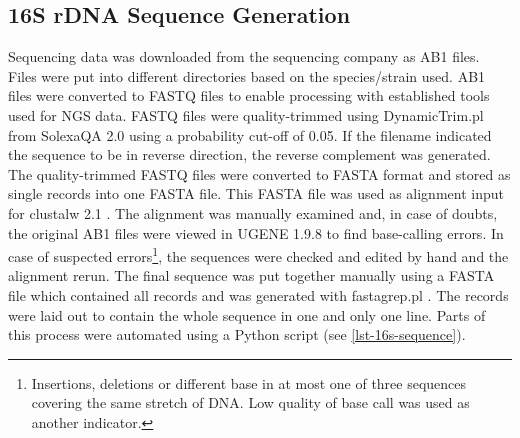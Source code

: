 \subsection{16S rDNA Sequence Generation\label{subsec-met-16s-computation}}
Sequencing data was downloaded from the sequencing company as AB1 files. Files were put into different directories based on the species/strain used. AB1 files were converted to FASTQ files to enable processing with established tools used for NGS data. FASTQ files were quality-trimmed using DynamicTrim.pl from SolexaQA 2.0 \cite{Cox2010} using a probability cut-off of \num{0.05}. %
If the filename indicated the sequence to be in reverse direction, the reverse complement was generated. The quality-trimmed FASTQ files were converted to FASTA format and stored as single records into one FASTA file. This FASTA file was used as alignment input for clustalw 2.1 \cite{Larkin2007}. The alignment was manually examined and, in case of doubts, the original AB1 files were viewed in UGENE 1.9.8 \cite{Okonechnikov2012} to find base-calling errors. In case of suspected errors\footnote{Insertions, deletions or different base in at most one of three sequences covering the same stretch of DNA. Low quality of base call was used as another indicator.}, the sequences were checked and edited by hand and the alignment rerun. The final sequence was put together manually using a FASTA file which contained all records and was generated with fastagrep.pl \cite{Booth2012}. The records were laid out to contain the whole sequence in one and only one line. Parts of this process were automated using a Python script (see \vref{lst-16s-sequence}).

